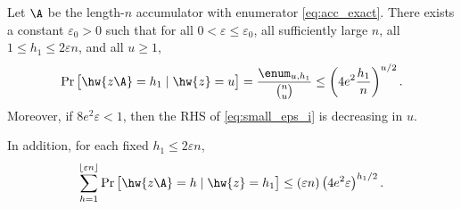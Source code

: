 \begin{lemma}
\label{lem:small_eps}
Let $\A$ be the length-$n$ accumulator with enumerator \eqref{eq:acc_exact}.
There exists a constant $\varepsilon_0>0$ such that for all
$0<\varepsilon\le \varepsilon_0$, all sufficiently large $n$, all
$1\le h_1\le 2\varepsilon n$, and all $u\ge 1$,
\begin{equation}
\label{eq:small_eps_i}
\Pr\big[\hw{z\A}=h_1\mid \hw{z}=u\big]
=\frac{\enum_{u,h_1}}{\binom{n}{u}}
\le \left(4e^2\frac{h_1}{n}\right)^{u/2}.
\end{equation}
Moreover, if $8e^2\varepsilon<1$, then the RHS of \eqref{eq:small_eps_i} is
decreasing in $u$.

In addition, for each fixed $h_1\le 2\varepsilon n$,
\begin{equation}
\label{eq:small_eps_ii}
\sum_{h=1}^{\lfloor \varepsilon n\rfloor}
\Pr\big[\hw{z\A}=h\mid \hw{z}=h_1\big]
\le (\varepsilon n)\left(4e^2\varepsilon\right)^{h_1/2}.
\end{equation}
\end{lemma}

